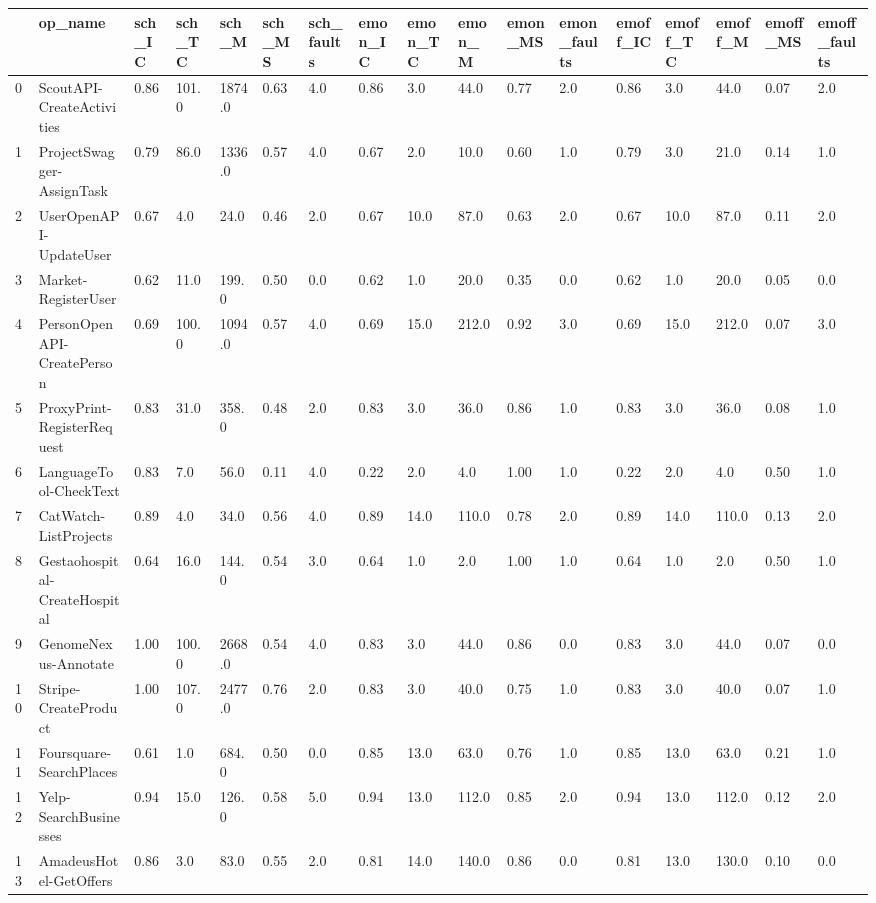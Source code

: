 \begin{tabular}{lllllllllllllllll}
\toprule
 & op\_name & sch\_IC & sch\_TC & sch\_M & sch\_MS & sch\_faults & emon\_IC & emon\_TC & emon\_M & emon\_MS & emon\_faults & emoff\_IC & emoff\_TC & emoff\_M & emoff\_MS & emoff\_faults \\
\midrule
0 & ScoutAPI-CreateActivities & 0.86 & 101.0 & 1874.0 & 0.63 & 4.0 & 0.86 & 3.0 & 44.0 & 0.77 & 2.0 & 0.86 & 3.0 & 44.0 & 0.07 & 2.0 \\
1 & ProjectSwagger-AssignTask & 0.79 & 86.0 & 1336.0 & 0.57 & 4.0 & 0.67 & 2.0 & 10.0 & 0.60 & 1.0 & 0.79 & 3.0 & 21.0 & 0.14 & 1.0 \\
2 & UserOpenAPI-UpdateUser & 0.67 & 4.0 & 24.0 & 0.46 & 2.0 & 0.67 & 10.0 & 87.0 & 0.63 & 2.0 & 0.67 & 10.0 & 87.0 & 0.11 & 2.0 \\
3 & Market-RegisterUser & 0.62 & 11.0 & 199.0 & 0.50 & 0.0 & 0.62 & 1.0 & 20.0 & 0.35 & 0.0 & 0.62 & 1.0 & 20.0 & 0.05 & 0.0 \\
4 & PersonOpenAPI-CreatePerson & 0.69 & 100.0 & 1094.0 & 0.57 & 4.0 & 0.69 & 15.0 & 212.0 & 0.92 & 3.0 & 0.69 & 15.0 & 212.0 & 0.07 & 3.0 \\
5 & ProxyPrint-RegisterRequest & 0.83 & 31.0 & 358.0 & 0.48 & 2.0 & 0.83 & 3.0 & 36.0 & 0.86 & 1.0 & 0.83 & 3.0 & 36.0 & 0.08 & 1.0 \\
6 & LanguageTool-CheckText & 0.83 & 7.0 & 56.0 & 0.11 & 4.0 & 0.22 & 2.0 & 4.0 & 1.00 & 1.0 & 0.22 & 2.0 & 4.0 & 0.50 & 1.0 \\
7 & CatWatch-ListProjects & 0.89 & 4.0 & 34.0 & 0.56 & 4.0 & 0.89 & 14.0 & 110.0 & 0.78 & 2.0 & 0.89 & 14.0 & 110.0 & 0.13 & 2.0 \\
8 & Gestaohospital-CreateHospital & 0.64 & 16.0 & 144.0 & 0.54 & 3.0 & 0.64 & 1.0 & 2.0 & 1.00 & 1.0 & 0.64 & 1.0 & 2.0 & 0.50 & 1.0 \\
9 & GenomeNexus-Annotate & 1.00 & 100.0 & 2668.0 & 0.54 & 4.0 & 0.83 & 3.0 & 44.0 & 0.86 & 0.0 & 0.83 & 3.0 & 44.0 & 0.07 & 0.0 \\
10 & Stripe-CreateProduct & 1.00 & 107.0 & 2477.0 & 0.76 & 2.0 & 0.83 & 3.0 & 40.0 & 0.75 & 1.0 & 0.83 & 3.0 & 40.0 & 0.07 & 1.0 \\
11 & Foursquare-SearchPlaces & 0.61 & 1.0 & 684.0 & 0.50 & 0.0 & 0.85 & 13.0 & 63.0 & 0.76 & 1.0 & 0.85 & 13.0 & 63.0 & 0.21 & 1.0 \\
12 & Yelp-SearchBusinesses & 0.94 & 15.0 & 126.0 & 0.58 & 5.0 & 0.94 & 13.0 & 112.0 & 0.85 & 2.0 & 0.94 & 13.0 & 112.0 & 0.12 & 2.0 \\
13 & AmadeusHotel-GetOffers & 0.86 & 3.0 & 83.0 & 0.55 & 2.0 & 0.81 & 14.0 & 140.0 & 0.86 & 0.0 & 0.81 & 13.0 & 130.0 & 0.10 & 0.0 \\

\end{tabular}
